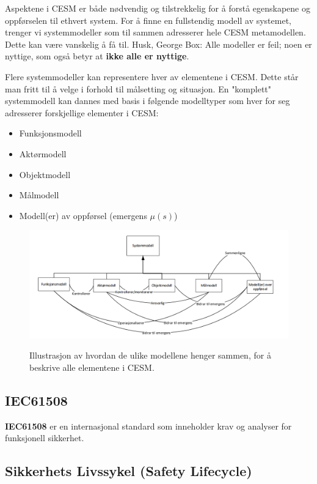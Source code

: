 Aspektene i CESM er både nødvendig og tilstrekkelig for å forstå egenskapene og oppførselen til ethvert system.
For å finne en fullstendig modell av systemet, trenger vi systemmodeller som til sammen adresserer hele CESM metamodellen. Dette kan være vanskelig å få til.  Husk, George Box: Alle modeller er feil;
noen er nyttige, som også betyr at \textbf{ikke alle er nyttige}.

Flere systemmodeller kan representere hver av elementene i CESM. Dette står man fritt til å velge i forhold til
målsetting og situasjon. En "komplett" systemmodell kan dannes med basis i følgende modelltyper som hver for
seg adresserer forskjellige elementer i CESM:


\begin{itemize}
    \item Funksjonsmodell
    \item Aktørmodell
    \item Objektmodell
    \item Målmodell
    \item Modell(er) av oppførsel (emergens $\mu(s)$)
\end{itemize}

\begin{figure}[H]
    \centering
        \includegraphics[width=\textwidth]{figures/IEC/systemmodell.PNG}\\
        \caption{Illustrasjon av hvordan de ulike modellene henger sammen, for å beskrive alle elementene i CESM.}
\end{figure}

\subsection{IEC61508}

\textbf{IEC61508} er en internasjonal standard som inneholder krav og analyser for funksjonell sikkerhet.



\subsection{Sikkerhets Livssykel (Safety Lifecycle)}


